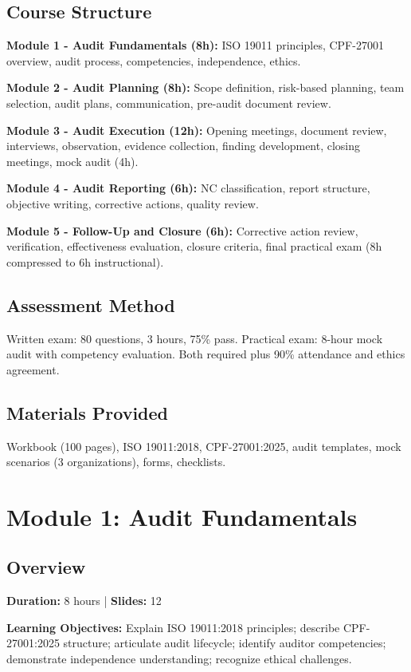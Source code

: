 \documentclass[11pt,a4paper]{article}
\begin{document}
\subsection{Course Structure}
\textbf{Module 1 - Audit Fundamentals (8h):} ISO 19011 principles, CPF-27001 overview, audit process, competencies, independence, ethics.

\textbf{Module 2 - Audit Planning (8h):} Scope definition, risk-based planning, team selection, audit plans, communication, pre-audit document review.

\textbf{Module 3 - Audit Execution (12h):} Opening meetings, document review, interviews, observation, evidence collection, finding development, closing meetings, mock audit (4h).

\textbf{Module 4 - Audit Reporting (6h):} NC classification, report structure, objective writing, corrective actions, quality review.

\textbf{Module 5 - Follow-Up and Closure (6h):} Corrective action review, verification, effectiveness evaluation, closure criteria, final practical exam (8h compressed to 6h instructional).

\subsection{Assessment Method}
Written exam: 80 questions, 3 hours, 75\% pass. Practical exam: 8-hour mock audit with competency evaluation. Both required plus 90\% attendance and ethics agreement.

\subsection{Materials Provided}
Workbook (100 pages), ISO 19011:2018, CPF-27001:2025, audit templates, mock scenarios (3 organizations), forms, checklists.

\newpage

\section{Module 1: Audit Fundamentals}

\subsection{Overview}
\textbf{Duration:} 8 hours | \textbf{Slides:} 12

\textbf{Learning Objectives:} Explain ISO 19011:2018 principles; describe CPF-27001:2025 structure; articulate audit lifecycle; identify auditor competencies; demonstrate independence understanding; recognize ethical challenges.
\end{document}
